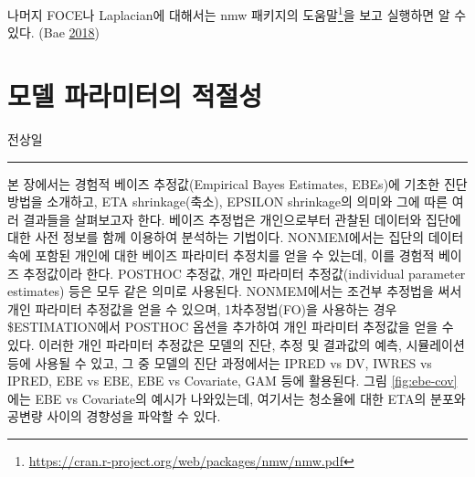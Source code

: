 \documentclass[
  11pt,
  krantz2, a4paper, twoside]{krantz}
\theoremstyle{definition}
\theoremstyle{definition}
\theoremstyle{definition}
\theoremstyle{remark}
\begin{document}
나머지 FOCE나 Laplacian에 대해서는 nmw 패키지의 도움말\footnote{\url{https://cran.r-project.org/web/packages/nmw/nmw.pdf}}을 보고 실행하면 알 수 있다. (Bae \protect\hyperlink{ref-R-nmw}{2018})

\hypertarget{parameters}{%
\chapter{모델 파라미터의 적절성}\label{parameters}}

\Large\hfill

전상일
\normalsize

\begin{center}\rule{0.5\linewidth}{0.5pt}\end{center}

본 장에서는 경험적 베이즈 추정값(Empirical Bayes Estimates, EBEs)에 기초한 진단 방법을 소개하고, ETA shrinkage(축소), EPSILON shrinkage의 의미와 그에 따른 여러 결과들을 살펴보고자 한다. 베이즈 추정법은 개인으로부터 관찰된 데이터와 집단에 대한 사전 정보를 함께 이용하여 분석하는 기법이다. NONMEM에서는 집단의 데이터 속에 포함된 개인에 대한 베이즈 파라미터 추정치를 얻을 수 있는데, 이를 경험적 베이즈 추정값이라 한다. POSTHOC 추정값, 개인 파라미터 추정값(individual parameter estimates) 등은 모두 같은 의미로 사용된다. NONMEM에서는 조건부 추정법을 써서 개인 파라미터 추정값을 얻을 수 있으며, 1차추정법(FO)을 사용하는 경우 \$ESTIMATION에서 POSTHOC 옵션을 추가하여 개인 파라미터 추정값을 얻을 수 있다. 이러한 개인 파라미터 추정값은 모델의 진단, 추정 및 결과값의 예측, 시뮬레이션 등에 사용될 수 있고, 그 중 모델의 진단 과정에서는 IPRED vs DV, IWRES vs IPRED, EBE vs EBE, EBE vs Covariate, GAM 등에 활용된다. 그림 \ref{fig:ebe-cov}에는 EBE vs Covariate의 예시가 나와있는데, 여기서는 청소율에 대한 ETA의 분포와 공변량 사이의 경향성을 파악할 수 있다.
\end{document}
